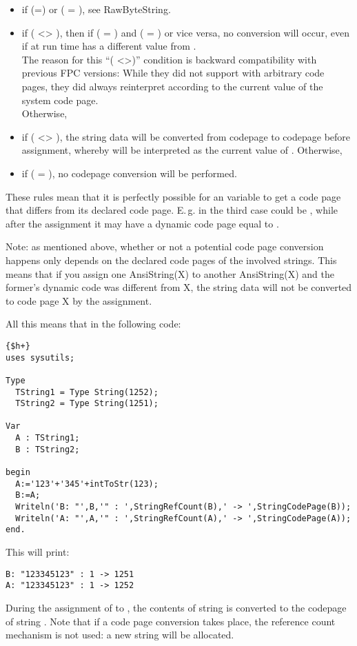 \begin{itemize}
\item if (=) or ( =
), see RawByteString.
\item if ( <> ), then if ( =
) and ( = ) or vice versa, no conversion will
occur, even if at run time  has a different value from
. \\
The reason for this ``( <>)'' condition is backward compatibility with previous FPC versions:
While they did not support  with arbitrary code pages, they did
always reinterpret  according to the current value of the system
code page. \\
Otherwise,
\item if ( <> ), the string data will be converted from
codepage  to codepage   before assignment, whereby
 will be
interpreted as the current value of . Otherwise,
\item if ( = ), no codepage conversion will be performed.
\end{itemize}
These rules mean that it is perfectly possible for an  variable to
get a code page that differs from its declared code page.
E.\,g. in the third case  could be , while after the
assignment it may have a dynamic code page equal to .

Note: as mentioned above, whether or not a potential code page conversion
happens only depends on the declared code pages of the involved strings.
This means that if you assign one AnsiString(X) to another AnsiString(X) and the
former's dynamic code was different from X, the string data will not be
converted to code page X by the assignment.

All this means that in the following code:
\begin{verbatim}
{$h+}
uses sysutils;

Type
  TString1 = Type String(1252);
  TString2 = Type String(1251);

Var
  A : TString1;
  B : TString2;

begin
  A:='123'+'345'+intToStr(123);
  B:=A;
  Writeln('B: "',B,'" : ',StringRefCount(B),' -> ',StringCodePage(B));
  Writeln('A: "',A,'" : ',StringRefCount(A),' -> ',StringCodePage(A));
end.
\end{verbatim}
This will print:
\begin{verbatim}
B: "123345123" : 1 -> 1251
A: "123345123" : 1 -> 1252
\end{verbatim}
During the assignment of  to , the contents of string 
is converted to the codepage of string .
Note that if a code page conversion takes place, the reference count mechanism is not used:
a new string will be allocated.

